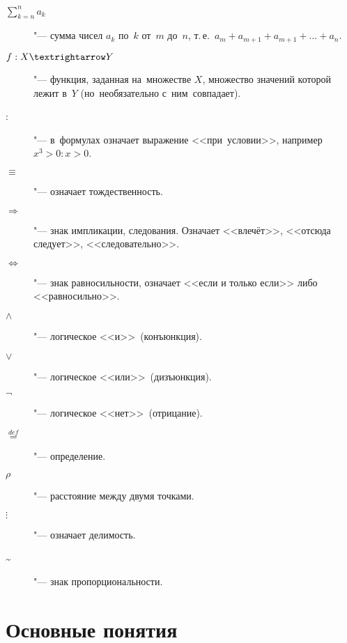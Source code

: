 \documentclass[]{scrartcl}
\begin{document}
\begin{description}
	\item[$\sum \limits_{k=n}^{n} a_k$] "--- сумма чисел $a_k$ по~$k$ от~$m$ до~$n$, т.\,е.~$a_m + a_{m+1}+a_{m+1}+\ldots+a_n$.
	\item[$f:X \textrightarrow Y$] "--- функция, заданная на~множестве $X$, множество значений которой лежит в~$Y$ (но~необязательно с~ним~совпадает).	
	\item[:] "--- в~формулах означает выражение <<при~условии>>, например $x^3>0:x>0$.
	\item[$\equiv$] "--- означает тождественность.
	\item[$\Rightarrow$] "--- знак импликации, следования. Означает <<влечёт>>, <<отсюда следует>>, <<следовательно>>.
	\item[$\Leftrightarrow$] "--- знак равносильности, означает <<если и только если>> либо <<равносильно>>.
	\item[$\wedge$] "--- логическое <<и>>~(конъюнкция).
	\item[$\vee$] "--- логическое <<или>>~(дизъюнкция).
	\item[$\neg$] "--- логическое <<нет>>~(отрицание).
	\item[$\stackrel{def}{=}$] "--- определение.
	\item[$\rho$] "--- расстояние между двумя точками.
	\item[$\vdots$] "--- означает делимость.
	\item[\~] "--- знак пропорциональности.
	
\end{description}

\section{Основные понятия}
\end{document}
